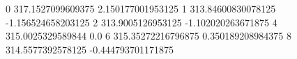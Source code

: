0 317.1527099609375 2.150177001953125
1 313.84600830078125 -1.156524658203125
2 313.9005126953125 -1.102020263671875
4 315.0025329589844 0.0
6 315.35272216796875 0.350189208984375
8 314.5577392578125 -0.444793701171875
